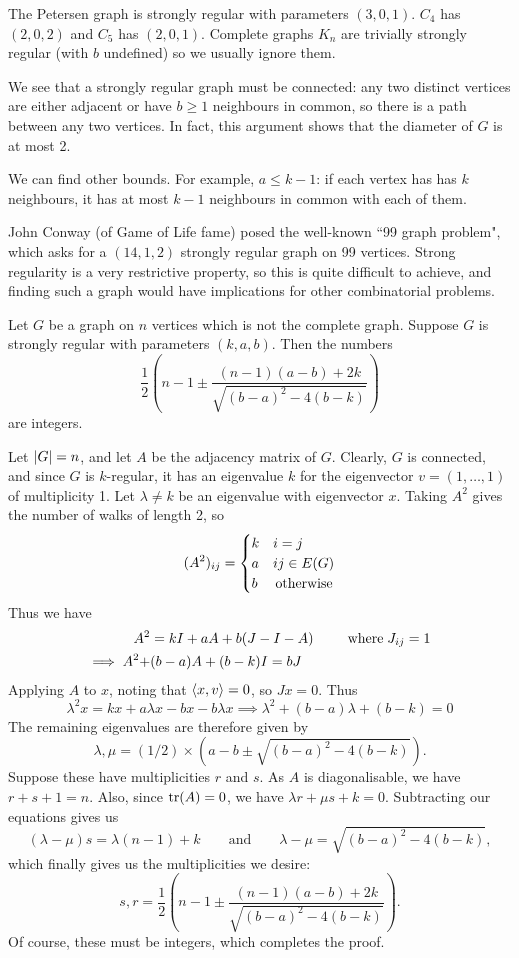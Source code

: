 \documentclass{article}
\begin{document}
The Petersen graph is strongly regular with parameters $(3, 0, 1)$. $C_4$ has $(2, 0, 2)$ and $C_5$ has $(2, 0, 1)$. Complete graphs $K_n$ are trivially strongly regular (with $b$ undefined) so we usually ignore them.

We see that a strongly regular graph must be connected: any two distinct vertices are either adjacent or have $b \geq 1$ neighbours in common, so there is a path between any two vertices. In fact, this argument shows that the diameter of $G$ is at most 2. 

We can find other bounds. For example, $a \leq k-1$: if each vertex has has $k$ neighbours, it has at most $k-1$ neighbours in common with each of them.

John Conway (of Game of Life fame) posed the well-known ``99 graph problem", which asks for a $(14, 1, 2)$ strongly regular graph on 99 vertices. Strong regularity is a very restrictive property, so this is quite difficult to achieve, and finding such a graph would have implications for other combinatorial problems.

\begin{theorem}
    Let $G$ be a graph on $n$ vertices which is not the complete graph. Suppose $G$ is strongly regular with parameters $(k, a, b)$.  Then the numbers
    \[
	\frac{1}{2} \left( n - 1 \pm \frac{(n-1)(a-b)+2k}{\sqrt{(b-a)^2 - 4(b-k)}} \right)
	\]
	are integers.
\end{theorem}

\begin{prf}
    Let $\left\lvert G \right\rvert = n$, and let $A$ be the adjacency matrix of $G$. Clearly, $G$ is connected, and since $G$ is $k$-regular, it has an eigenvalue $k$ for the eigenvector $v = (1, \dots, 1)$ of multiplicity 1. Let $\lambda \neq k$ be an eigenvalue with eigenvector $x$. Taking $A^2$ gives the number of walks of length 2, so
    \[
	(A^2)_{ij} = \begin{cases}
		k & i=j \\
		a & ij \in E(G) \\
		b & \mathrel{\, \text{otherwise}}
	\end{cases}
	\]
	Thus we have
	\begin{align*}
    	A^2 &= kI + aA + b(J-I-A) \qquad \mathrel{\, \text{where}} J_{ij} = 1 \\
    	\implies A^2 + &(b-a)A + (b-k) I = bJ
	\end{align*}
	Applying $A$ to $x$, noting that $\left\langle x, v \right\rangle = 0$, so $Jx = 0$. Thus
	\[
	\lambda^2 x = kx + a\lambda x - bx - b \lambda x \implies \lambda^2 + (b-a)\lambda + (b-k) = 0
	\]
	The remaining eigenvalues are therefore given by
	\[
	\lambda, \mu = (1/2) \times (a-b \pm \sqrt{(b-a)^2 - 4(b-k)}).
	\]
	Suppose these have multiplicities $r$ and $s$. As $A$ is diagonalisable, we have $r+s+1=n$. Also, since $\operatorname{tr}(A) = 0$, we have $\lambda r + \mu s + k = 0$. Subtracting our equations gives us
	\[
	(\lambda - \mu) s = \lambda(n-1) + k \qquad \text{and} \qquad \lambda - \mu = \sqrt{(b-a)^2 - 4(b-k)},
	\]
	which finally gives us the multiplicities we desire:
	\[
	s, r = \frac{1}{2} \left( n - 1 \pm \frac{(n-1)(a-b)+2k}{\sqrt{(b-a)^2 - 4(b-k)}} \right).
	\]
	Of course, these must be integers, which completes the proof.
\end{prf}
\end{document}
